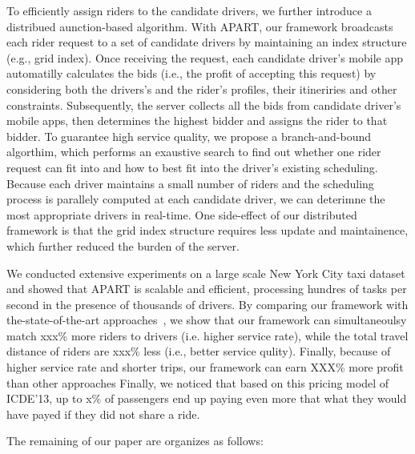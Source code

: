 To efficiently assign riders to the candidate drivers, we further introduce a distribued aunction-based algorithm. With APART, our framework broadcasts each rider request to a set of candidate drivers by maintaining an index structure (e.g., grid index). Once receiving the request, each candidate driver's mobile app automatilly calculates the bids (i.e., the profit of accepting this request) by considering both the drivers's and the rider's profiles, their itineriries and other constraints. Subsequently, the server collects all the bids from candidate driver's mobile apps, then determines the highest bidder and assigns the rider to that bidder. To guarantee high service quality, we propose a branch-and-bound algorthim, which performs an exaustive search to find out whether one rider request can fit into and how to best fit into the driver's existing scheduling. Because each driver maintains a small number of riders and the scheduling process is parallely computed at each candidate driver, we can deterimne the most appropriate drivers in real-time. One side-effect of our distributed framework is that the grid index structure requires less update and maintainence, which further reduced the burden of the server.  

We conducted extensive experiments on a large scale New York City taxi dataset and showed that APART is scalable and efficient, processing hundres of tasks per second in the presence of thousands of drivers. By comparing our framework with the-state-of-the-art approaches~\cite{Huang14}, we show that our framework can simultaneoulsy match xxx\% more riders to drivers (i.e. higher service rate), while the total travel distance of riders are xxx\% less (i.e., better service qulity). Finally, because of higher service rate and shorter trips, our framework can earn XXX\% more profit than other approaches
Finally, we noticed that based on this pricing model of ICDE'13, up to x\% of passengers end up paying even more that what they would have payed if they did not share a ride.

The remaining of our paper are organizes as follows:



